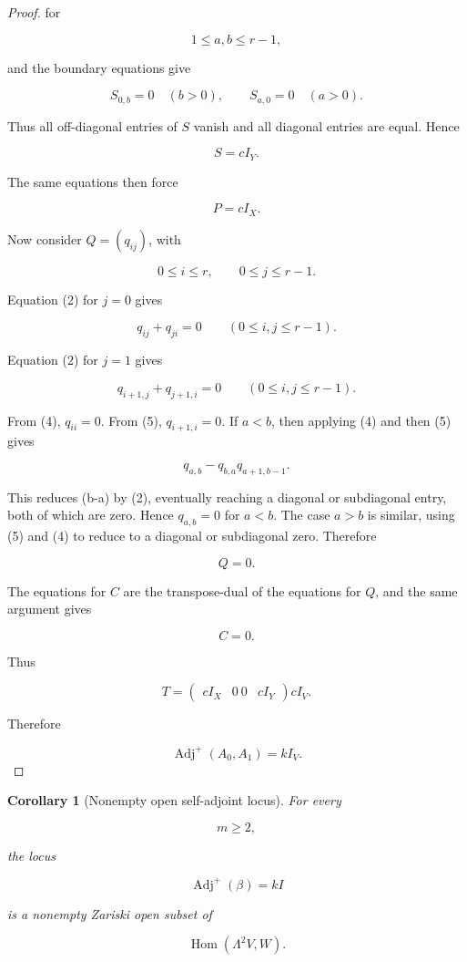 \documentclass[11pt]{article}
\newtheorem{corollary}[theorem]{Corollary}
\begin{document}
\begin{proof}
for

\[
1\le a,b\le r-1,
\]

and the boundary equations give

\[
S_{0,b}=0\quad(b>0),
\qquad
S_{a,0}=0\quad(a>0).
\]

Thus all off-diagonal entries of $S$ vanish and all diagonal entries are equal. Hence

\[
S=cI_Y.
\]

The same equations then force

\[
P=cI_X.
\]

Now consider $Q=(q_{ij})$, with

\[
0\le i\le r,
\qquad
0\le j\le r-1.
\]

Equation (2) for $j=0$ gives

\[
q_{ij}+q_{ji}=0
\qquad
(0\le i,j\le r-1).
\tag{4}
\]

Equation (2) for $j=1$ gives

\[
q_{i+1,j}+q_{j+1,i}=0
\qquad
(0\le i,j\le r-1).
\tag{5}
\]

From (4), $q_{ii}=0$. From (5), $q_{i+1,i}=0$. If $a<b$, then applying (4) and then (5) gives

\[
q_{a,b}
-q_{b,a}
q_{a+1,b-1}.
\]

This reduces (b-a) by (2), eventually reaching a diagonal or subdiagonal entry, both of which are zero. Hence $q_{a,b}=0$ for $a<b$. The case $a>b$ is similar, using (5) and (4) to reduce to a diagonal or subdiagonal zero. Therefore

\[
Q=0.
\]

The equations for $C$ are the transpose-dual of the equations for $Q$, and the same argument gives

\[
C=0.
\]

Thus

\[
T=
\begin{pmatrix}
cI_X&0\
0&cI_Y
\end{pmatrix}
cI_V.
\]

Therefore

\[
\operatorname{Adj}^+(A_0,A_1)=kI_V.
\]

\end{proof}

\begin{corollary}[Nonempty open self-adjoint locus]

For every

\[
m\ge2,
\]

the locus

\[
\operatorname{Adj}^+(\beta)=kI
\]

is a nonempty Zariski open subset of

\[
\operatorname{Hom}(\Lambda^2V,W).
\]

\end{corollary}
\end{document}
